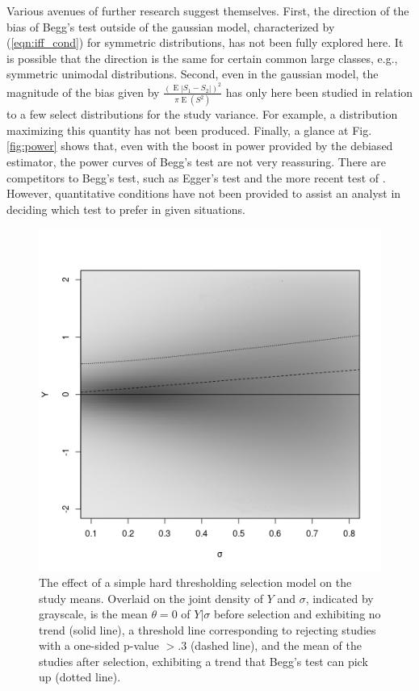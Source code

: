 \documentclass[12pt]{article}
\newcommand{\y}{Y}
\newcommand{\s}{S}
\DeclareMathOperator{\E}{E}
\begin{document}
  Various avenues of further research suggest themselves. First, the
  direction of the bias of Begg's test outside of the gaussian model,
  characterized by (\ref{eqn:iff_cond}) for symmetric distributions,
  has not been fully explored here. It is possible that the direction
  is the same for certain common large classes, e.g., symmetric unimodal
  distributions. Second, even in the gaussian model, the magnitude of
  the bias given by $\frac{(\E|\s_1-\s_2|)^2}{\pi\E(\s^2)}$
  has only here been studied in relation to a few select distributions
  for the study variance. For example, a distribution maximizing this
  quantity has not been produced. Finally, a glance at
  Fig. \ref{fig:power} shows that, even with the boost in power
  provided by the debiased estimator, the power curves of Begg's test
  are not very reassuring. There are competitors to Begg's test, such
  as Egger's test and the more recent test of \citet{lin2018}. However, 
  quantitative conditions have not been provided to assist an analyst
  in deciding which test to prefer in given situations.

\begin{figure}
  \includegraphics[width=\linewidth]{selection.png}
  \caption{  The effect of a simple hard thresholding selection model on the
  study means. Overlaid on the joint density of $\y$ and $\sigma$, indicated by grayscale, is the mean $\theta=0$ of $\y|\sigma$
  before selection and exhibiting no
  trend (solid line), a threshold line corresponding to rejecting studies with a one-sided p-value
  $>.3$ (dashed line), and the mean of the studies
  after selection, exhibiting a trend that Begg's test can pick up (dotted line).
}
  \label{fig:selection}
\end{figure}
  
\end{document}
